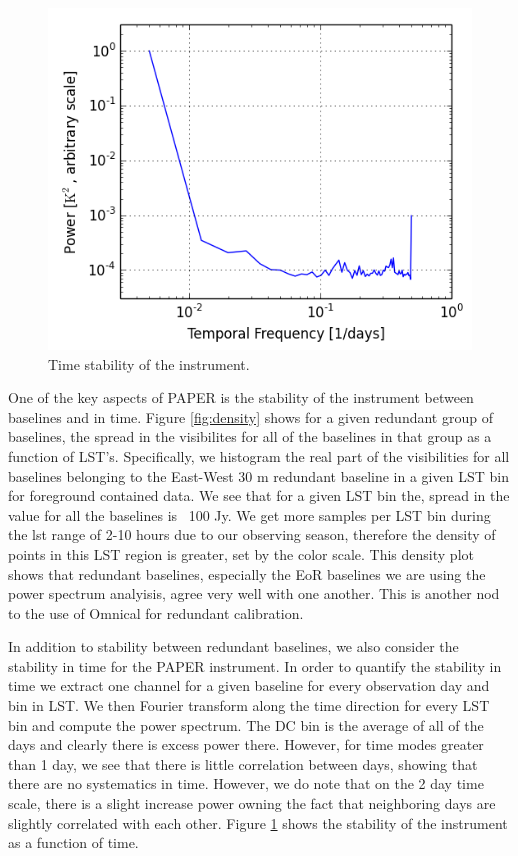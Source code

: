 \documentclass[twocolumn,numberedappendix]{emulateapj} \shorttitle{PSA64}
\begin{document}
\begin{figure}[!t]
\centering
\includegraphics[width=\columnwidth]{plots/stability.png}
\caption{Time stability of the instrument.}
\label{fig:stability}
\end{figure}


One of the key aspects of PAPER is the stability of the instrument between
baselines and in time. Figure \ref{fig:density} shows for a given redundant
group of baselines, the spread in the visibilites for all of the baselines in
that group as a function of LST's. Specifically, we histogram the real part of
the visibilities for all baselines belonging to the East-West 30 m redundant
baseline in a given LST bin for foreground contained data. We see that for a
given LST bin the, spread in the value for all the baselines is ~100 Jy.  We get
more samples per LST bin during the lst range of 2-10 hours due to our observing
season, therefore the density of points in this LST region is greater, set by
the color scale. This density plot shows that redundant baselines, especially
the EoR baselines we are using the power spectrum analyisis, agree very well
with one another. This is another nod to the use of Omnical for redundant
calibration. 

In addition to stability between redundant baselines, we also consider the
stability in time for the PAPER instrument. In order to quantify the stability
in time we extract one channel for a given baseline for every observation day
and bin in LST. We then Fourier transform along the time direction for every LST
bin and compute the power spectrum. The DC bin is the average of all of the days
and clearly there is excess power there. However, for time modes greater than 1
day, we see that there is little correlation between days, showing that there
are no systematics in time. However, we do note that on the 2 day time scale,
there is a slight increase power owning the fact that neighboring days are
slightly correlated with each other.  Figure \ref{fig:stability} shows the
stability of the instrument as a function of time. 
\end{document}
